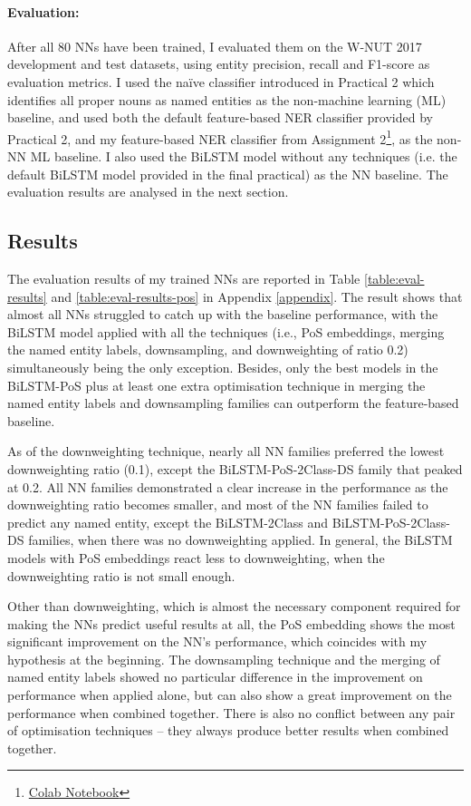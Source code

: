 \documentclass[11pt,a4paper]{article}
\begin{document}
\paragraph{Evaluation:}
After all 80 NNs have been trained, I evaluated them on the W-NUT 2017 development and test datasets, using entity precision, recall and F1-score as evaluation metrics. I used the na\"{i}ve classifier introduced in Practical 2 which identifies all proper nouns as named entities as the non-machine learning (ML) baseline, and used both the default feature-based NER classifier provided by Practical 2, and my feature-based NER classifier from Assignment 2\footnote{\href{https://colab.research.google.com/drive/1NFr1gBZZX6JvxzVIanZuLs-uS6ddGJUM?usp=sharing}{Colab Notebook}}, as the non-NN ML baseline. I also used the BiLSTM model without any techniques (i.e. the default BiLSTM model provided in the final practical) as the NN baseline. The evaluation results are analysed in the next section.

\subsection{Results}

The evaluation results of my trained NNs are reported in Table \ref{table:eval-results} and \ref{table:eval-results-pos} in Appendix \ref{appendix}. The result shows that almost all NNs struggled to catch up with the baseline performance, with the BiLSTM model applied with all the techniques (i.e., PoS embeddings, merging the named entity labels, downsampling, and downweighting of ratio 0.2) simultaneously being the only exception. Besides, only the best models in the BiLSTM-PoS plus at least one extra optimisation technique in merging the named entity labels and downsampling families can outperform the feature-based baseline.

As of the downweighting technique, nearly all NN families preferred the lowest downweighting ratio (0.1), except the BiLSTM-PoS-2Class-DS family that peaked at 0.2. All NN families demonstrated a clear increase in the performance as the downweighting ratio becomes smaller, and most of the NN families failed to predict any named entity, except the BiLSTM-2Class and BiLSTM-PoS-2Class-DS families, when there was no downweighting applied. In general, the BiLSTM models with PoS embeddings react less to downweighting, when the downweighting ratio is not small enough.

Other than downweighting, which is almost the necessary component required for making the NNs predict useful results at all, the PoS embedding shows the most significant improvement on the NN's performance, which coincides with my hypothesis at the beginning. The downsampling technique and the merging of named entity labels showed no particular difference in the improvement on performance when applied alone, but can also show a great improvement on the performance when combined together. There is also no conflict between any pair of optimisation techniques -- they always produce better results when combined together.
\end{document}
